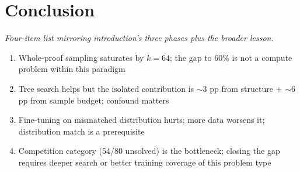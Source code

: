 \documentclass[openany, amssymb, psamsfonts]{amsart}
\begin{document}
\section{Conclusion}

\textit{Four-item list mirroring introduction's three phases plus the broader lesson.}

\begin{enumerate}
  \item Whole-proof sampling saturates by $k=64$; the gap to 60\% is not a compute problem within this paradigm
  \item Tree search helps but the isolated contribution is $\sim$3 pp from structure + $\sim$6 pp from sample budget; confound matters
  \item Fine-tuning on mismatched distribution hurts; more data worsens it; distribution match is a prerequisite
  \item Competition category (54/80 unsolved) is the bottleneck; closing the gap requires deeper search or better training coverage of this problem type
\end{enumerate}
\end{document}
